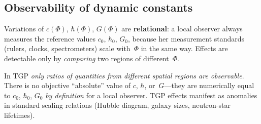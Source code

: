 \subsection{Observability of dynamic constants}%
\label{ssec:obserwabilnosc-stalych}

Variations of $c(\Phi)$, $\hbar(\Phi)$, $G(\Phi)$ are
\textbf{relational}: a local observer always measures the
reference values $c_0$, $\hbar_0$, $G_0$, because her
measurement standards (rulers, clocks, spectrometers) scale
with~$\Phi$ in the same way.  Effects are detectable only
by \emph{comparing} two regions of different~$\Phi$.

\begin{remark}%
\label{rem:relacyjna}
In TGP \emph{only ratios of quantities from different spatial
regions are observable}.  There is no objective ``absolute''
value of $c$, $\hbar$, or~$G$---they are numerically equal to
$c_0$, $\hbar_0$, $G_0$ \emph{by definition} for a local observer.
TGP effects manifest as anomalies in standard scaling relations
(Hubble diagram, galaxy sizes, neutron-star lifetimes).
\end{remark}
